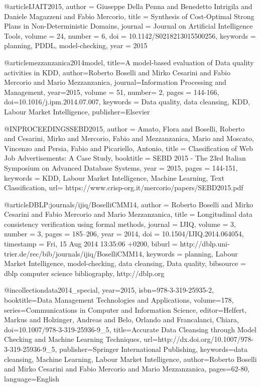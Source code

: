 {{{}


@article{IJAIT2015,
   author = {Giuseppe {Della Penna} and Benedetto Intrigila and Daniele Magazzeni and Fabio Mercorio},
   title = {Synthesis of Cost-Optimal Strong Plans in Non-Deterministic Domains},
   journal = {Journal on Artificial Intelligence Tools},
   volume = {24},
   number = {6},
   doi = {10.1142/S0218213015500256},
   keywords = {planning, PDDL, model-checking},
   year = {2015}
}

@article{mezzanzanica2014model,
  title={A model-based evaluation of Data quality activities in {KDD}},
  author={Roberto Boselli and Mirko Cesarini and Fabio Mercorio and Mario Mezzanzanica},
  journal={Information Processing and Management},
  year={2015},
  volume = {51},
  number= {2},
  pages = {144-166},
  doi={10.1016/j.ipm.2014.07.007},
  keywords = {Data quality, data cleansing, KDD, Labour Market Intelligence},
  publisher={Elsevier}
}


@INPROCEEDINGS{SEBD2015,
author = {Amato, Flora and Boselli, Roberto and Cesarini, Mirko and Mercorio, Fabio and Mezzanzanica, Mario and Moscato, Vincenzo and Persia, Fabio and Picariello, Antonio},
title = {Classification of Web Job Advertisements: A Case Study},
booktitle = {SEBD 2015 - The 23rd Italian Symposium on Advanced Database Systems},
year = {2015},
pages = {144-151},
keywords = {KDD, Labour Market Intelligence, Machine Learning, Text Classification},
url= {https://www.crisp-org.it/mercorio/papers/SEBD2015.pdf}
}

@article{DBLP:journals/ijiq/BoselliCMM14,
  author    = {Roberto Boselli and
               Mirko Cesarini and
               Fabio Mercorio and
               Mario Mezzanzanica},
  title     = {Longitudinal data consistency verification using formal methods},
  journal   = {IJIQ},
  volume    = {3},
  number    = {3},
  pages     = {185--206},
  year      = {2014},
  doi       = {10.1504/IJIQ.2014.064054},
  timestamp = {Fri, 15 Aug 2014 13:35:06 +0200},
  biburl    = {http://dblp.uni-trier.de/rec/bib/journals/ijiq/BoselliCMM14},
  keywords = {planning, Labour Market Intelligence, model-checking, data cleansing, Data quality},
  bibsource = {dblp computer science bibliography, http://dblp.org}
}

@incollection{data2014_special,
year={2015},
isbn={978-3-319-25935-2},
booktitle={Data Management Technologies and Applications},
volume={178},
series={Communications in Computer and Information Science},
editor={Helfert, Markus and Holzinger, Andreas and Belo, Orlando and Francalanci, Chiara},
doi={10.1007/978-3-319-25936-9_5},
title={Accurate Data Cleansing through Model Checking and Machine Learning Techniques},
url={http://dx.doi.org/10.1007/978-3-319-25936-9_5},
publisher={Springer International Publishing},
keywords={data cleansing, Machine Learning, Labour Market Intelligence},
author={Roberto Boselli and Mirko Cesarini and Fabio Mercorio and Mario Mezzanzanica},
pages={62-80},
language={English}
}


}}
